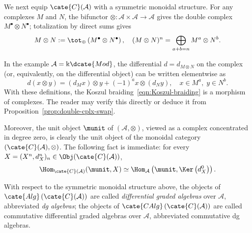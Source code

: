 We next equip $\cate{C}(\mathcal{A})$ with a symmetric monoidal structure.
For any complexes $M$ and $N$, the bifunctor
$\otimes:\mathcal{A}\times\mathcal{A}\to\mathcal{A}$ gives the double
complex $M^\bullet\otimes N^\bullet$; totalization by direct sums gives
\[ M \otimes N := \tot_{\oplus}\left( M^\bullet \otimes N^\bullet \right), \quad (M \otimes N)^n = \bigoplus_{a+b=n} M^a \otimes N^b. \]

In the example $\mathcal{A}=\Bbbk\dcate{Mod}$, the differential
$d=d_{M\otimes N}$ on the complex (or, equivalently, on the differential
object) can be written elementwise as
\begin{equation*}
	d(x \otimes y) = (d_M x) \otimes y + (-1)^a x \otimes (d_N y), \quad x \in M^a, \; y \in N^b.
\end{equation*}
With these definitions, the Koszul braiding~\eqref{eqn:Koszul-braiding}
is a morphism of complexes. The reader may verify this directly or deduce it
from Proposition~\ref{prop:double-cplx-swap}.

Moreover, the unit object $\munit$ of $(\mathcal{A},\otimes)$, viewed as a
complex concentrated in degree zero, is clearly the unit object of the
monoidal category $(\cate{C}(\mathcal{A}),\otimes)$. The following fact is
immediate: for every
$X=(X^n,d_X^n)_n\in\Obj(\cate{C}(\mathcal{A}))$,
\begin{equation}\label{eqn:unit-map-into-cplx}
	\Hom_{\cate{C}(\mathcal{A})}(\munit, X) \simeq \Hom_{\mathcal{A}}\left( \munit, \Ker\left(d_X^0 \right) \right).
\end{equation}

\begin{definition}\label{def:dg-algebra}
	With respect to the symmetric monoidal structure above, the objects of
	$\cate{Alg}\left(\cate{C}(\mathcal{A})\right)$ are called
	\emph{differential graded algebras} over $\mathcal{A}$, abbreviated
	\emph{dg algebras}; the objects of
	$\cate{CAlg}\left(\cate{C}(\mathcal{A})\right)$ are called commutative
	differential graded algebras over $\mathcal{A}$, abbreviated commutative
	dg algebras.
\end{definition}

